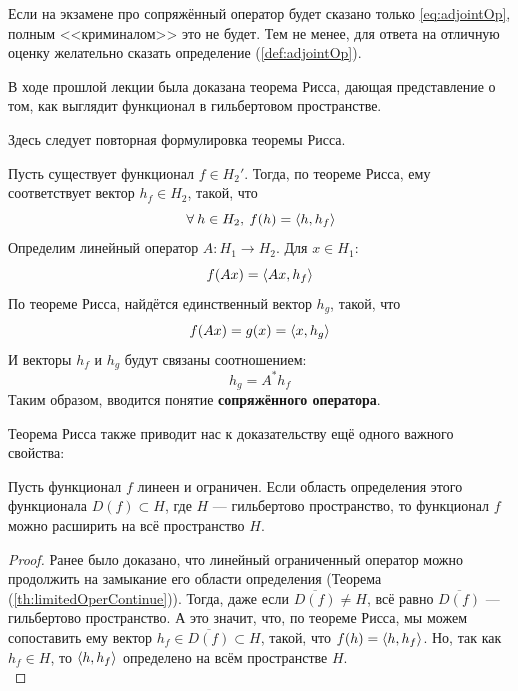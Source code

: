 \documentclass[12pt]{article}
\begin{document}
	{ \color{gray}
		Если на экзамене про сопряжённый оператор будет сказано только \eqref{eq:adjointOp}, полным <<криминалом>> это не будет.
		Тем не менее, для ответа на отличную оценку желательно сказать определение (\ref{def:adjointOp}).
	}


	В ходе прошлой лекции была доказана теорема Рисса, дающая представление о том, как выглядит функционал в гильбертовом пространстве.
	
	{\color{gray}
		Здесь следует повторная формулировка теоремы Рисса.
	}
	
	Пусть существует функционал $f \in H_2'$. Тогда, по теореме Рисса, ему соответствует вектор $h_f \in H_2$, такой, что 
	$$\forall h \in H_2, \: f(h) = \scal{h}{h_f}$$
	Определим линейный оператор $A : H_1 \rightarrow H_2$. Для $x \in H_1$: 
	$$f(Ax) = \left\langle Ax, h_f \right\rangle$$
	По теореме Рисса, найдётся единственный вектор $h_g$, такой, что 
	$$f(Ax) = g(x) = \left\langle x, h_g \right\rangle$$
	И векторы $h_f$ и $h_g$ будут связаны соотношением:
	$$h_g = A^{*}h_f$$
	Таким образом, вводится понятие \textbf{сопряжённого оператора}.

	Теорема Рисса также приводит нас к доказательству ещё одного важного свойства:
	\begin{state}
		Пусть функционал $f$ линеен и ограничен. Если область определения этого функционала $D(f) \subset H$, 
		где $H$ --- гильбертово пространство, то функционал $f$ можно расширить на всё пространство $H$.
	\end{state}
	\begin{proof}
		Ранее было доказано, что линейный ограниченный оператор можно продолжить на замыкание его области определения 
		(Теорема (\ref{th:limitedOperContinue})). Тогда, даже если $\overline{D(f)} \neq H$, всё равно $\overline{D(f)}$ --- гильбертово 
		пространство.
		А это значит, что, по теореме Рисса, мы можем сопоставить ему вектор $h_f \in \overline{D(f)} \subset H$, такой, что 
		$f(h) = \left\langle h, h_f \right\rangle$. Но, так как $h_f \in H$, то $\left\langle h, h_f \right\rangle$ определено на всём пространстве $H$. \\
	\end{proof}
	
\end{document}
